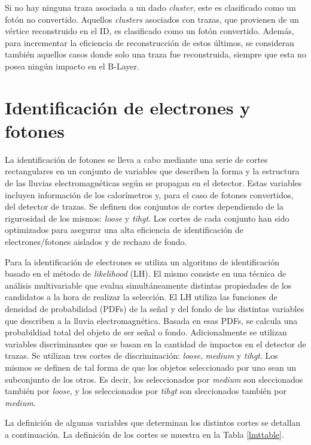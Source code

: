 Si no hay ninguna traza asociada a un dado \textit{cluster}, este es clasificado como un fotón no convertido. Aquellos \textit{clusters} asociados con trazas, que provienen de un vértice reconstruido en el ID, es clasificado como un fotón convertido. Además, para incrementar la eficiencia de reconstrucción de estos últimos, se consideran también aquellos casos donde solo una traza fue reconstruida, siempre que esta no posea ningún impacto en el B-Layer.

\section{Identificación de electrones y fotones}

La identificación de fotones se lleva a cabo mediante una serie de cortes rectangulares en un conjunto de variables que describen la forma y la estructura de las lluvias electromagnéticas según se propagan en el detector. Estas variables incluyen información de los calorímetros y, para el caso de fotones convertidos, del detector de trazas. Se definen dos conjuntos de cortes dependiendo de la rigurosidad de los mismos: \textit{loose} y \textit{tihgt}. Los cortes de cada conjunto han sido optimizados para asegurar una alta eficiencia de identificación de electrones/fotones aislados y de rechazo de fondo. 

Para la identificación de electrones se utiliza un algoritmo de identificación basado en el método de \textit{likelihood} (LH). El mismo consiste en una técnica de análisis multivariable que evalua simultáneamente distintas propiedades de los candidatos a la hora de realizar la selección. El LH utiliza las funciones de densidad de probabilidad (PDFs) de la señal y del fondo de las distintas variables que describen a la lluvia electromagnética. Basada en esas PDFs, se calcula una probabildiad total del objeto de ser señal o fondo. Adicionalmente se utilizan variables discriminantes que se basan en la cantidad de impactos en el detector de trazas. Se utilizan tres cortes de discriminación: \textit{loose}, \textit{medium} y \textit{tihgt}. Los mismos se definen de tal forma de que los objetos seleccionado por uno sean un subconjunto de los otros. Es decir, los seleccionados por \textit{medium} son sleccionados también por \textit{loose}, y los seleccionados por \textit{tihgt} son sleccionados también por \textit{medium}.


La definición de algunas variables que determinan los distintos cortes se detallan a continuación. La definición de los cortes se muestra en la Tabla \ref{lmttable}.


